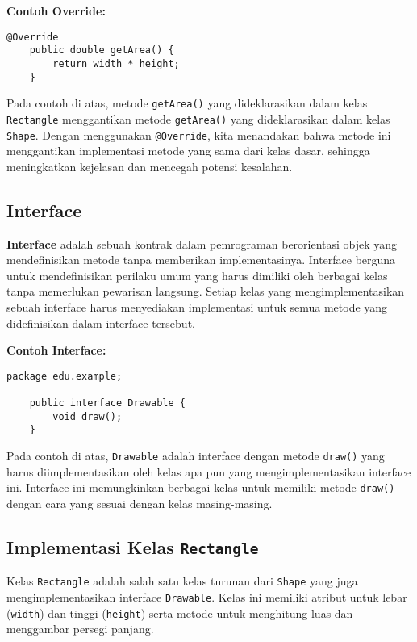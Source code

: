 \textbf{Contoh Override:}

\begin{lstlisting}[style=JavaStyle]
	@Override
	public double getArea() {
		return width * height;
	}
\end{lstlisting}

Pada contoh di atas, metode \texttt{getArea()} yang dideklarasikan dalam kelas \texttt{Rectangle} menggantikan metode \texttt{getArea()} yang dideklarasikan dalam kelas \texttt{Shape}. Dengan menggunakan \texttt{@Override}, kita menandakan bahwa metode ini menggantikan implementasi metode yang sama dari kelas dasar, sehingga meningkatkan kejelasan dan mencegah potensi kesalahan.

\subsection{Interface}

\textbf{Interface} adalah sebuah kontrak dalam pemrograman berorientasi objek yang mendefinisikan metode tanpa memberikan implementasinya. Interface berguna untuk mendefinisikan perilaku umum yang harus dimiliki oleh berbagai kelas tanpa memerlukan pewarisan langsung. Setiap kelas yang mengimplementasikan sebuah interface harus menyediakan implementasi untuk semua metode yang didefinisikan dalam interface tersebut.

\textbf{Contoh Interface:}

\begin{lstlisting}[style=JavaStyle, caption={Drawable.java}]
	package edu.example;
	
	public interface Drawable {
		void draw();
	}
\end{lstlisting}

Pada contoh di atas, \texttt{Drawable} adalah interface dengan metode \texttt{draw()} yang harus diimplementasikan oleh kelas apa pun yang mengimplementasikan interface ini. Interface ini memungkinkan berbagai kelas untuk memiliki metode \texttt{draw()} dengan cara yang sesuai dengan kelas masing-masing.

\subsection{Implementasi Kelas \texttt{Rectangle}}

Kelas \texttt{Rectangle} adalah salah satu kelas turunan dari \texttt{Shape} yang juga mengimplementasikan interface \texttt{Drawable}. Kelas ini memiliki atribut untuk lebar (\texttt{width}) dan tinggi (\texttt{height}) serta metode untuk menghitung luas dan menggambar persegi panjang.

